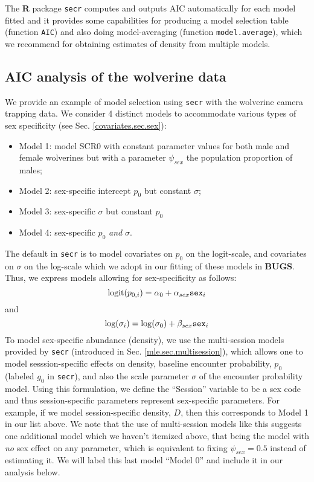 The {\bf R} package \mbox{\tt secr} computes and outputs AIC
automatically for each model fitted and it provides some capabilities
for producing a model selection table (function \mbox{\tt AIC}) and
also doing model-averaging (function \mbox{\tt model.average}), which
we recommend for obtaining estimates of density from multiple models.

\subsection{AIC analysis of the wolverine data}

We provide an example of model selection using \mbox{\tt secr} with the
wolverine camera trapping data. We consider 4 distinct models to accommodate
various types of sex specificity (see Sec. \ref{covariates.sec.sex}):
\hspace{.5in} \begin{itemize}
\item[] Model 1: model SCR0 with constant parameter
values for both male and female wolverines but with a parameter
$\psi_{sex}$ the population proportion of males;
\item[] Model 2: sex-specific intercept
$p_{0}$ but constant $\sigma$;
\item[] Model 3: sex-specific $\sigma$ but constant
$p_{0}$
\item[] Model 4: sex-specific $p_{0}$ {\it and} $\sigma$.
\end{itemize}
The default in \mbox{\tt secr} is to model covariates on $p_{0}$ on
the logit-scale, and covariates on $\sigma$ on the
log-scale which we adopt in our fitting of these models in {\bf
  BUGS}. Thus,  we express  models allowing for sex-specificity
as follows:
\[
 \mbox{logit}(p_{0,i}) = \alpha_{0} + \alpha_{sex} \mbox{\tt sex}_{i}
\]
and
\[
 \mbox{log}(\sigma_{i}) = \log(\sigma_{0}) + \beta_{sex} \mbox{\tt sex}_{i}
\]
To model sex-specific abundance (density),
we
 use the multi-session models  provided by
\mbox{\tt secr} (introduced in Sec. \ref{mle.sec.multisession}), which
allows one to model sesssion-specific effects on density, baseline
encounter probability, $p_{0}$ (labeled $g_{0}$ in \mbox{\tt secr}), and also the scale
parameter $\sigma$ of the encounter probability model. Using this
formulation, we define the ``Session'' variable to be a sex code and
thus session-specific parameters represent sex-specific parameters.
For example, if we model session-specific density, $D$, then this
corresponds to Model 1 in our list above.  We note that the use of
multi-session models like this suggests
one additional model which we haven't itemized above, that being the
model with {\it no} sex effect on any parameter, which is equivalent
to fixing $\psi_{sex} = 0.5$ instead of estimating it. We will label
this last model ``Model 0'' and include it in our analysis below.


